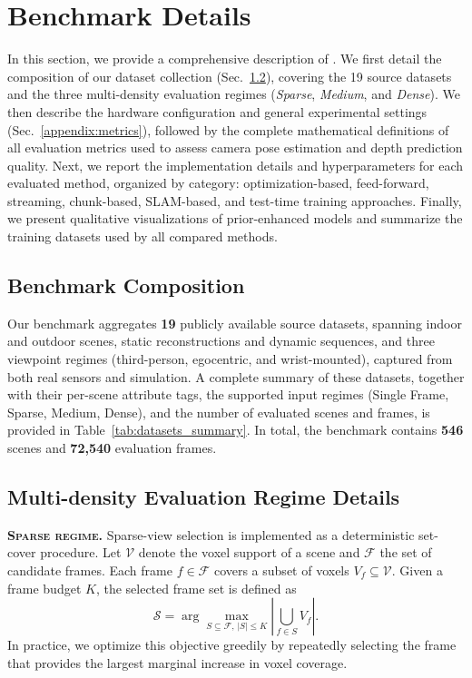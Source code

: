 \section{Benchmark Details}
\label{appendix:benchmarkdetails}

In this section, we provide a comprehensive description of \benchmark.
%
We first detail the composition of our dataset collection (Sec.~\ref{app:regime-details}), covering the 19 source datasets and the three multi-density evaluation regimes (\textit{Sparse}, \textit{Medium}, and \textit{Dense}).
%
We then describe the hardware configuration and general experimental settings (Sec.~\ref{appendix:metrics}), followed by the complete mathematical definitions of all evaluation metrics used to assess camera pose estimation and depth prediction quality.
%
Next, we report the implementation details and hyperparameters for each evaluated method, organized by category: optimization-based, feed-forward, streaming, chunk-based, SLAM-based, and test-time training approaches.
%
Finally, we present qualitative visualizations of prior-enhanced models and summarize the training datasets used by all compared methods.

\subsection{Benchmark Composition}
\label{appendix:full_benchmark}

Our benchmark aggregates \textbf{19} publicly available source datasets, spanning indoor and outdoor scenes, static reconstructions and dynamic sequences, and three viewpoint regimes (third-person, egocentric, and wrist-mounted), captured from both real sensors and simulation.
%
A complete summary of these datasets, together with their per-scene attribute tags, the supported input regimes (Single Frame, Sparse, Medium, Dense), and the number of evaluated scenes and frames, is provided in Table~\ref{tab:datasets_summary}.
%
In total, the benchmark contains \textbf{546} scenes and
\textbf{72{,}540} evaluation frames.




\subsection{Multi-density Evaluation Regime Details}
\label{app:regime-details}


\textbf{\textsc{Sparse regime.}}
Sparse-view selection is implemented as a deterministic set-cover procedure.
Let $\mathcal{V}$ denote the voxel support of a scene and $\mathcal{F}$ the set of candidate frames.
Each frame $f \in \mathcal{F}$ covers a subset of voxels $V_f \subseteq \mathcal{V}$.
Given a frame budget $K$, the selected frame set is defined as
\[
\mathcal{S}
=
\arg\max_{S \subseteq \mathcal{F},\, |S| \le K}
\left|
\bigcup_{f \in S} V_f
\right|.
\]
In practice, we optimize this objective greedily by repeatedly selecting the frame that provides the largest marginal increase in voxel coverage.

